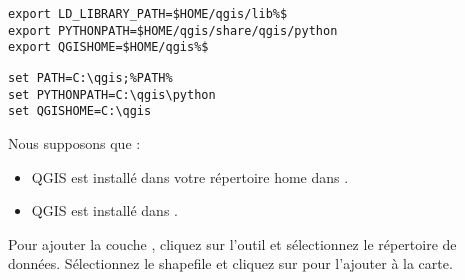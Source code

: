 \nix{}\osx{}
\begin{verbatim}
export LD_LIBRARY_PATH=$HOME/qgis/lib%$
export PYTHONPATH=$HOME/qgis/share/qgis/python
export QGISHOME=$HOME/qgis%$
\end{verbatim}

\win{}
\begin{verbatim}
set PATH=C:\qgis;%PATH%
set PYTHONPATH=C:\qgis\python
set QGISHOME=C:\qgis
\end{verbatim}

Nous supposons que :
\begin{itemize}
\item\nix{}\osx{}QGIS est installé dans votre répertoire home dans . 
\item\win{}QGIS est installé dans .
\end{itemize}


Pour ajouter la couche , cliquez sur l'outil  et sélectionnez le répertoire de données. Sélectionnez le shapefile et cliquez sur  pour l'ajouter à la carte.


